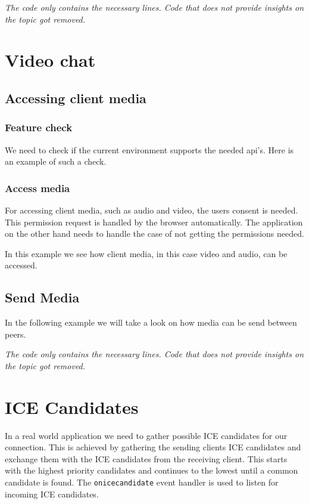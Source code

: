 \textit{The code only contains the necessary lines. Code that does not provide insights on the topic got removed.}


\section{Video chat}

\subsection{Accessing client media}

\subsubsection{Feature check}
We need to check if the current environment supports the needed \Gls{api}'s. Here is an example of such a check.


\subsubsection{Access media}
For accessing client media, such as audio and video, the users consent is needed. This permission request is handled by the browser automatically. The application on the other hand needs to handle the case of not getting the permissions needed.

In this example we see how client media, in this case video and audio, can be accessed.


\subsection{Send Media}
In the following example we will take a look on how media can be send between peers.

\textit{The code only contains the necessary lines. Code that does not provide insights on the topic got removed.}


\section{ICE Candidates}
In a real world application we need to gather possible ICE candidates for our connection. This is achieved by gathering the sending clients ICE candidates and exchange them with the ICE candidates from the receiving client. This starts with the highest priority candidates and continues to the lowest until a common candidate is found. The \lstinline[basicstyle=\ttfamily\color{black}]|onicecandidate| event handler is used to listen for incoming ICE candidates.
